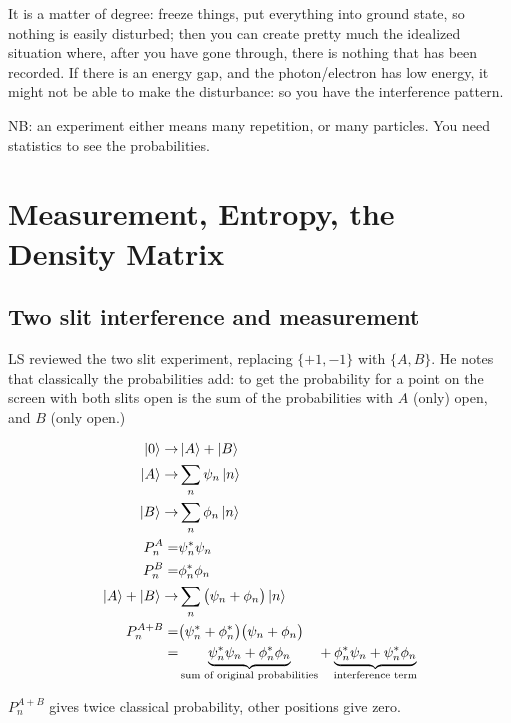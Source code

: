 \documentclass[]{article}
\begin{document}
It is a matter of degree: freeze things, put everything into ground state, so nothing is easily disturbed; then you can create pretty much the idealized situation where, after you have gone through, there is nothing that has been recorded. If there is an energy gap, and the photon/electron has low energy, it might not be able to make the disturbance: so you have the interference pattern.

NB: an experiment either means many repetition, or many particles. You need statistics to see the probabilities.


\section{Measurement, Entropy, the Density Matrix}

\subsection{Two slit interference and measurement} 
LS reviewed the two slit experiment, replacing $\{+1,-1\}$ with $\{A,B\}$. He notes that classically the probabilities add: to get the probability for a point on the screen with both slits open is the sum of the probabilities with $A$ (only) open, and $B$ (only open.) 

\begin{align*}
	\ket{0}\rightarrow& \ket{A} + \ket{B}\\
	\ket{A} \rightarrow& \sum_n \psi_n \ket{n}\\
	\ket{B} \rightarrow& \sum_n \phi_n \ket{n}\\
	P_n^A =& \psi_n^* \psi_n\\
	P_n^B =& \phi_n^* \phi_n\\
	\ket{A} + \ket{B} \rightarrow & \sum_n \big(\psi_n + \phi_n\big) \ket{n}\\
	P_n^{A+B} =& \big(\psi_n^* + \phi_n^*\big)\big(\psi_n + \phi_n\big)\\
	=& \underbrace{\psi_n^*\psi_n + \phi_n^*\phi_n}_\text{sum of original probabilities} + \underbrace{\phi_n^*\psi_n + \psi_n^*\phi_n}_\text{interference term}
\end{align*}

$P_n^{A+B}$ gives twice classical probability, other positions give zero.
\end{document}

